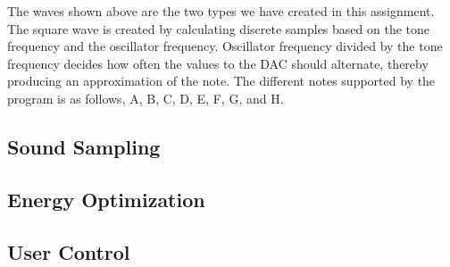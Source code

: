 


The waves shown above are the two types we have created in this assignment. The square wave is created by calculating discrete samples based on the tone frequency and the oscillator frequency. Oscillator frequency divided by the tone frequency decides how often the values to the DAC should alternate, thereby producing an approximation of the note. The different notes supported by the program is as follows, A, B, C, D, E, F, G, and H.


\subsection{Sound Sampling}





\subsection{Energy Optimization}




\subsection{User Control}












